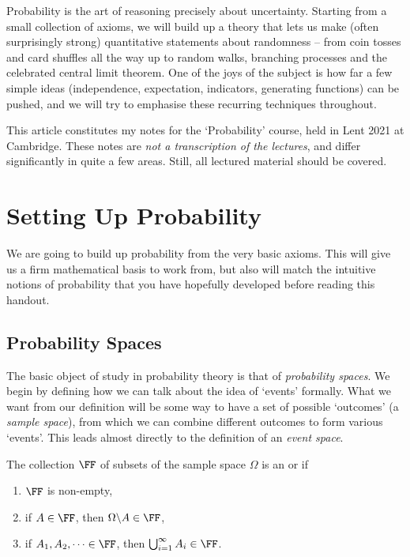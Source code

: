 




Probability is the art of reasoning precisely about uncertainty. Starting from a small collection of axioms, we will build up a theory that lets us make (often surprisingly strong) quantitative statements about randomness -- from coin tosses and card shuffles all the way up to random walks, branching processes and the celebrated central limit theorem. One of the joys of the subject is how far a few simple ideas (independence, expectation, indicators, generating functions) can be pushed, and we will try to emphasise these recurring techniques throughout.

This article constitutes my notes for the `Probability' course, held in Lent 2021 at Cambridge. These notes are \emph{not a transcription of the lectures}, and differ significantly in quite a few areas. Still, all lectured material should be covered.



\section{Setting Up Probability}

We are going to build up probability from the very basic axioms. This will give us a firm mathematical basis to work from, but also will match the intuitive notions of probability that you have hopefully developed before reading this handout.

\subsection{Probability Spaces}

The basic object of study in probability theory is that of \emph{probability spaces}. We begin by defining how we can talk about the idea of `events' formally. What we want from our definition will be some way to have a set of possible `outcomes' (a \emph{sample space}), from which we can combine different outcomes to form various `events'. This leads almost directly to the definition of an \emph{event space}.

\begin{definition} The collection $\FF$ of subsets of the sample space $\Omega$ is an  or  if
	\begin{enumerate}
		\item $\FF$ is non-empty,
		\item if $A \in \FF$, then $\Omega \backslash A \in \FF$,
		\item if $A_1, A_2, \dots \in \FF$, then $\bigcup_{i = 1}^{\infty} A_i \in \FF$.
	\end{enumerate}
\end{definition}

